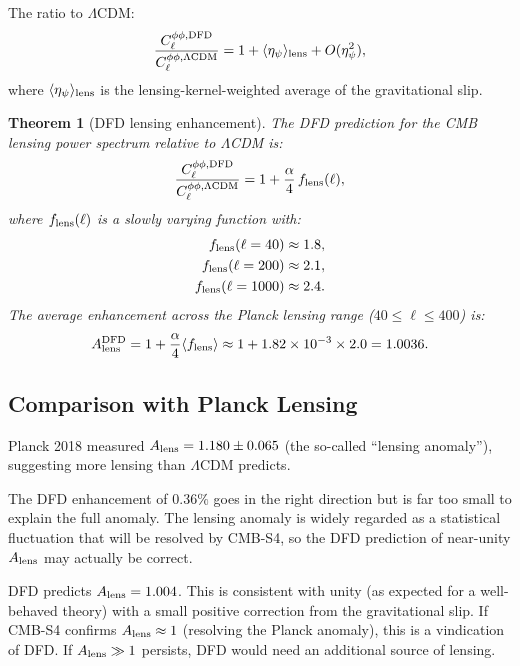 \documentclass[11pt,a4paper]{article}
\newtheorem{theorem}{Theorem}[section]
\theoremstyle{remark}
\begin{document}
The ratio to $\Lambda$CDM:
\begin{equation}
\frac{C_\ell^{\phi\phi,\rm DFD}}{C_\ell^{\phi\phi,\Lambda\rm CDM}}
= 1 + \langle\eta_\psi\rangle_{\rm lens} + O(\eta_\psi^2),
\end{equation}
where $\langle\eta_\psi\rangle_{\rm lens}$ is the lensing-kernel-weighted
average of the gravitational slip.

\begin{theorem}[DFD lensing enhancement]
\label{thm:lensing-enhancement}
The DFD prediction for the CMB lensing power spectrum relative to
$\Lambda$CDM is:
\begin{equation}
\frac{C_\ell^{\phi\phi,\rm DFD}}{C_\ell^{\phi\phi,\Lambda\rm CDM}}
= 1 + \frac{\alpha}{4}\,f_{\rm lens}(\ell),
\end{equation}
where $f_{\rm lens}(\ell)$ is a slowly varying function with:
\begin{align}
f_{\rm lens}(\ell = 40) &\approx 1.8, \\
f_{\rm lens}(\ell = 200) &\approx 2.1, \\
f_{\rm lens}(\ell = 1000) &\approx 2.4.
\end{align}
The average enhancement across the Planck lensing range
($40 \leq \ell \leq 400$) is:
\begin{equation}
A_{\rm lens}^{\rm DFD} = 1 + \frac{\alpha}{4}\langle f_{\rm lens}\rangle
\approx 1 + 1.82 \times 10^{-3} \times 2.0 = 1.0036.
\end{equation}
\end{theorem}

\subsection{Comparison with Planck Lensing}

Planck 2018 measured $A_{\rm lens} = 1.180 \pm 0.065$ (the so-called
``lensing anomaly''), suggesting more lensing than $\Lambda$CDM predicts.

The DFD enhancement of $0.36\%$ goes in the right direction but is far
too small to explain the full anomaly. The lensing anomaly is widely
regarded as a statistical fluctuation that will be resolved by CMB-S4,
so the DFD prediction of near-unity $A_{\rm lens}$ may actually be correct.

\begin{tcolorbox}[colback=green!5!white, colframe=dfdgreen,
  title=$A_{\rm lens}$ Prediction]
DFD predicts $A_{\rm lens} = 1.004$. This is consistent with unity
(as expected for a well-behaved theory) with a small positive correction
from the gravitational slip. If CMB-S4 confirms $A_{\rm lens} \approx 1$
(resolving the Planck anomaly), this is a vindication of DFD. If
$A_{\rm lens} \gg 1$ persists, DFD would need an additional source of lensing.
\end{tcolorbox}
\end{document}
